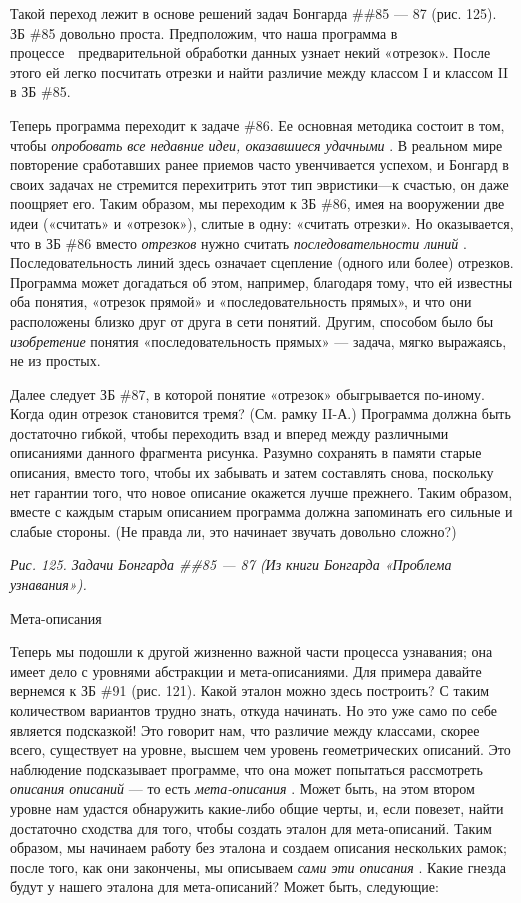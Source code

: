 \documentclass[../main.tex]{subfiles}
\begin{document}
Такой переход лежит в основе решений задач Бонгарда \#\#85 --- 87 (рис. 125). ЗБ \#85 довольно проста. Предположим, что наша программа в процессе~~предварительной обработки данных узнает некий «отрезок». После этого ей легко посчитать отрезки и найти различие между классом I и классом II в ЗБ \#85.

Теперь программа переходит к задаче \#86. Ее основная методика состоит в том, чтобы \emph{опробовать все недавние идеи, оказавшиеся удачными} . В реальном мире повторение сработавших ранее приемов часто увенчивается успехом, и Бонгард в своих задачах не стремится перехитрить этот тип эвристики---к счастью, он даже поощряет его. Таким образом, мы переходим к ЗБ \#86, имея на вооружении две идеи («считать» и «отрезок»), слитые в одну: «считать отрезки». Но оказывается, что в ЗБ \#86 вместо \emph{отрезков} нужно считать \emph{последовательности линий} . Последовательность линий здесь означает сцепление (одного или более) отрезков. Программа может догадаться об этом, например, благодаря тому, что ей известны оба понятия, «отрезок прямой» и «последовательность прямых», и что они расположены близко друг от друга в сети понятий. Другим, способом было бы \emph{изобретение} понятия «последовательность прямых» --- задача, мягко выражаясь, не из простых.

Далее следует ЗБ \#87, в которой понятие «отрезок» обыгрывается по-иному. Когда один отрезок становится тремя? (См. рамку II-А.) Программа должна быть достаточно гибкой, чтобы переходить взад и вперед между различными описаниями данного фрагмента рисунка. Разумно сохранять в памяти старые описания, вместо того, чтобы их забывать и затем составлять снова, поскольку нет гарантии того, что новое описание окажется лучше прежнего. Таким образом, вместе с каждым старым описанием программа должна запоминать его сильные и слабые стороны. (Не правда ли, это начинает звучать довольно сложно?)

\emph{Рис. 125. Задачи Бонгарда \#\#85 --- 87 (Из книги Бонгарда «Проблема узнавания»).}

Мета-описания

Теперь мы подошли к другой жизненно важной части процесса узнавания; она имеет дело с уровнями абстракции и мета-описаниями. Для примера давайте вернемся к ЗБ \#91 (рис. 121). Какой эталон можно здесь построить? С таким количеством вариантов трудно знать, откуда начинать. Но это уже само по себе является подсказкой! Это говорит нам, что различие между классами, скорее всего, существует на уровне, высшем чем уровень геометрических описаний. Это наблюдение подсказывает программе, что она может попытаться рассмотреть \emph{описания описаний} --- то есть \emph{мета-описания} . Может быть, на этом втором уровне нам удастся обнаружить какие-либо общие черты, и, если повезет, найти достаточно сходства для того, чтобы создать эталон для мета-описаний. Таким образом, мы начинаем работу без эталона и создаем описания нескольких рамок; после того, как они закончены, мы описываем \emph{сами эти описания} . Какие гнезда будут у нашего эталона для мета-описаний? Может быть, следующие:
\end{document}
